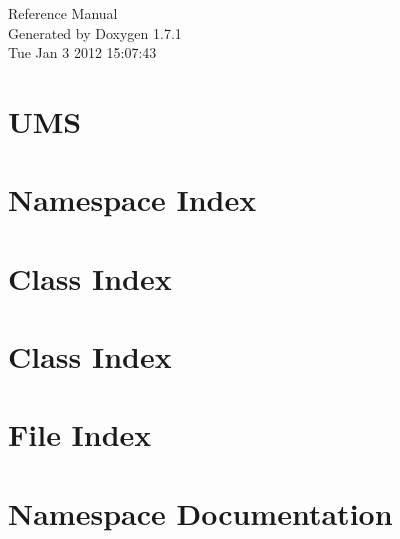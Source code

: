 \documentclass[a4paper]{book}
\begin{document}
\hypersetup{pageanchor=false}
\begin{titlepage}
\vspace*{7cm}
\begin{center}
{\Large Reference Manual}\\
\vspace*{1cm}
{\large Generated by Doxygen 1.7.1}\\
\vspace*{0.5cm}
{\small Tue Jan 3 2012 15:07:43}\\
\end{center}
\end{titlepage}
\clearemptydoublepage
{}
\tableofcontents
\clearemptydoublepage
{}
\hypersetup{pageanchor=true}
\chapter{UMS}
\label{index}\hypertarget{index}{}
\chapter{Namespace Index}

\chapter{Class Index}

\chapter{Class Index}

\chapter{File Index}

\chapter{Namespace Documentation}

\end{document}
